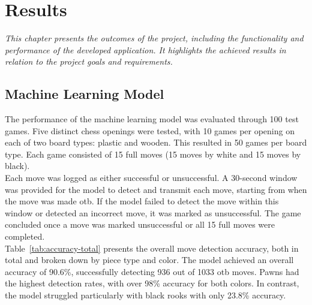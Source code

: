 \chapter{Results}


\begin{center}
    \textit{This chapter presents the outcomes of the project, including the functionality and performance of the developed application. It highlights the achieved results in relation to the project goals and requirements.}
\end{center}

\section{Machine Learning Model}

The performance of the machine learning model was evaluated through 100 test games. Five distinct chess openings were tested, with 10 games per opening on each of two board types: plastic and wooden. This resulted in 50 games per board type. Each game consisted of 15 full moves (15 moves by white and 15 moves by black). \\

Each move was logged as either successful or unsuccessful. A 30-second window was provided for the model to detect and transmit each move, starting from when the move was made \gls{otb}. If the model failed to detect the move within this window or detected an incorrect move, it was marked as unsuccessful. The game concluded once a move was marked unsuccessful or all 15 full moves were completed. \\

Table~\ref{tab:accuracy-total} presents the overall move detection accuracy, both in total and broken down by piece type and color. The model achieved an overall accuracy of 90.6\%, successfully detecting 936 out of 1033 \gls{otb} moves. Pawns had the highest detection rates, with over 98\% accuracy for both colors. In contrast, the model struggled particularly with black rooks with only 23.8\% accuracy.

\newpage

